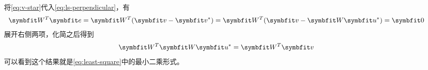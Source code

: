 将\cref{eq:v-star}代入\cref{eq:ls-perpendicular}，有
\begin{equation*}
    \MW^T\Ve=\MW^T(\Vv-\Vv^*)=\MW^T(\Vv-\MW\Vu^*)=\vec{0}
\end{equation*}
展开右侧两项，化简之后得到
\begin{equation}
    \MW^T\MW\Vu^*=\MW^T\Vv
\end{equation}
可以看到这个结果就是\cref{eq:least-square}中的最小二乘形式。